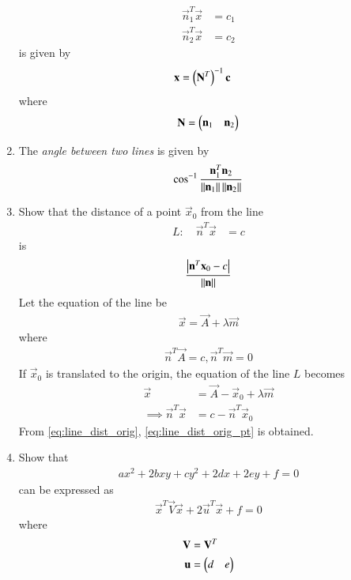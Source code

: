 \begin{enumerate}[label=\arabic*.,ref=\thesubsection.\theenumi]
\begin{align}
\vec{n}_1^T\vec{x} &=c_1
\\
\vec{n}_2^T\vec{x} &=c_2
\end{align}
is given by 
\begin{align}
\label{eq:line_intersection}
\mathbf{x} &=\left(\mathbf{N}^T\right)^{-1}\mathbf{c}
\end{align}
where 
\begin{align}
\mathbf{N} = \begin{pmatrix}\mathbf{n}_1 & \mathbf{n}_2\end{pmatrix}
\end{align}
\item The {\em angle between two lines} is given by 
\begin{align}
\cos ^{-1} \frac{\mathbf{n}_1 ^T \mathbf{n}_2}{\left\lVert\mathbf{n}_1\right\rVert  \left\lVert\mathbf{n}_2\right\rVert}
\end{align}
\item Show that the distance of a point $\vec{x}_0$ from the line 
\begin{align}
L: \quad \vec{n}^T\vec{x} &=c
\end{align}
is 
\begin{align}
\frac{\left\vert\mathbf{n}^T\mathbf{x}_0-c\right\vert}{\left\lVert\mathbf{n}\right\rVert} 
\label{eq:line_dist_pt}
\end{align}
\solution Let the equation of the line be 
\begin{align}
\vec{x} = \vec{A} + \lambda \vec{m}
\end{align}
%
where 
\begin{align}
\label{eq:line_dist_orig_pt}
\vec{n}^T\vec{A} = c, \vec{n}^T\vec{m} = 0
\end{align}
If $\vec{x}_0$ is translated to the origin, the equation of the line $L$ becomes 
\begin{align}
\vec{x} &= \vec{A}- \vec{x}_0+ \lambda \vec{m}
\\
\implies 
\vec{n}^T\vec{x} &=c-\vec{n}^T\vec{x}_0
\end{align}
From \eqref{eq:line_dist_orig}, \eqref{eq:line_dist_orig_pt} is obtained.
\item Show that 
\begin{align}
ax^2+2bxy+cy^2+2dx+2ey+f=0
\end{align}
can be expressed as
\begin{align}
\label{eq:quad_form}
\vec{x}^T\vec{V}\vec{x}+2\vec{u}^T\vec{x}+f=0
\end{align}
%
where
\begin{align}
\mathbf{V} &= \mathbf{V}^T
\\
\mathbf{u} &= \begin{pmatrix}d & e\end{pmatrix}
\end{align}


\end{enumerate}
